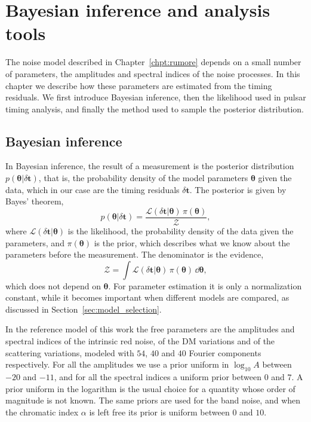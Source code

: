 \chapter{Bayesian inference and analysis tools} \label{chpt:inferenza}

The noise model described in Chapter~\ref{chpt:rumore} depends on a small
number of parameters, the amplitudes and spectral indices of the noise
processes. In this chapter we describe how these parameters are estimated from
the timing residuals. We first introduce Bayesian inference, then the
likelihood used in pulsar timing analysis, and finally the method used to
sample the posterior distribution.

\section{Bayesian inference} \label{sec:bayes}

In Bayesian inference, the result of a measurement is the posterior
distribution $p(\bm{\theta}|\delta\bm{t})$, that is, the probability density
of the model parameters $\bm{\theta}$ given the data, which in our case are the
timing residuals $\delta\bm{t}$. The posterior is given by Bayes' theorem,
\begin{equation}
    p(\bm{\theta}|\delta\bm{t}) =
    \frac{\mathcal{L}(\delta\bm{t}|\bm{\theta})\,\pi(\bm{\theta})}{\mathcal{Z}},
    \label{eq:bayes}
\end{equation}
where $\mathcal{L}(\delta\bm{t}|\bm{\theta})$ is the likelihood, the
probability density of the data given the parameters, and $\pi(\bm{\theta})$ is
the prior, which describes what we know about the parameters before the
measurement. The denominator is the evidence,
\begin{equation}
    \mathcal{Z} = \int \mathcal{L}(\delta\bm{t}|\bm{\theta})\,
    \pi(\bm{\theta})\,\dd\bm{\theta},
    \label{eq:evidence}
\end{equation}
which does not depend on $\bm{\theta}$. For parameter estimation it is only a
normalization constant, while it becomes important when different models are
compared, as discussed in Section~\ref{sec:model_selection}.

In the reference model of this work the free parameters are the amplitudes and
spectral indices of the intrinsic red noise, of the DM variations and of the
scattering variations, modeled with $54$, $40$ and $40$ Fourier components
respectively. For all the amplitudes we use a prior uniform in $\log_{10}A$
between $-20$ and $-11$, and for all the spectral indices a uniform prior
between $0$ and $7$. A prior uniform in the logarithm is the usual choice for
a quantity whose order of magnitude is not known. The same priors are used for
the band noise, and when the chromatic index $\alpha$ is left free its prior is
uniform between $0$ and $10$.

